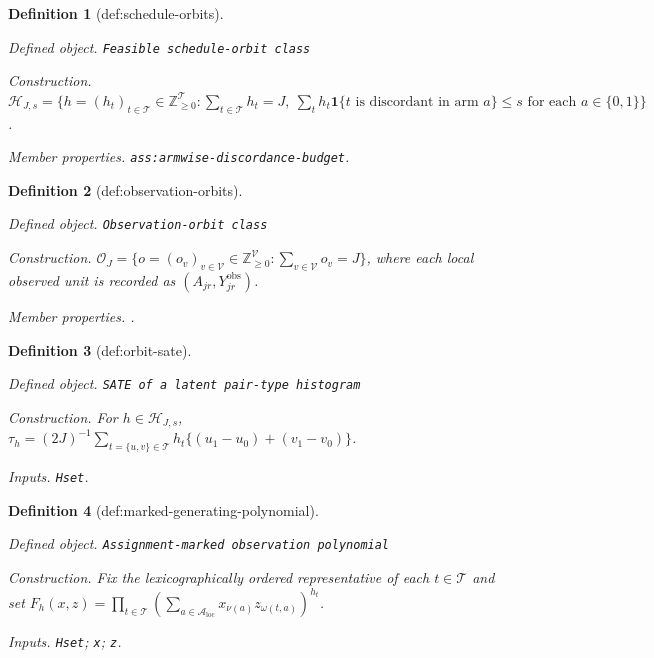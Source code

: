\documentclass{article}
\newtheorem{definition}{Definition}
\begin{document}
\begin{definition}[def:schedule-orbits]\label{def:schedule-orbits}
\par\smallskip\noindent\emph{Defined object.} \texttt{Feasible schedule-\allowbreak{}orbit class}
\par\smallskip\noindent\emph{Construction.} \(\mathcal H_{J,s}=\{h=(h_t)_{t\in\mathcal T}\in\mathbb Z_{\ge0}^{\mathcal T}:\sum_{t\in\mathcal T}h_t=J,\ \sum_t h_t\mathbf 1\{t\text{ is discordant in arm }a\}\le s\text{ for each }a\in\{0,1\}\}\).
\par\smallskip\noindent\emph{Member properties.} \texttt{ass:\allowbreak{}armwise-\allowbreak{}discordance-\allowbreak{}budget}.
\end{definition}

\begin{definition}[def:observation-orbits]\label{def:observation-orbits}
\par\smallskip\noindent\emph{Defined object.} \texttt{Observation-\allowbreak{}orbit class}
\par\smallskip\noindent\emph{Construction.} \(\mathcal O_J=\{o=(o_v)_{v\in\mathcal V}\in\mathbb Z_{\ge0}^{\mathcal V}:\sum_{v\in\mathcal V}o_v=J\}\), where each local observed unit is recorded as \((A_{jr},Y^{\mathrm{obs}}_{jr})\).
\par\smallskip\noindent\emph{Member properties.} .
\end{definition}

\begin{definition}[def:orbit-sate]\label{def:orbit-sate}
\par\smallskip\noindent\emph{Defined object.} \texttt{SATE of a latent pair-\allowbreak{}type histogram}
\par\smallskip\noindent\emph{Construction.} For \(h\in\mathcal H_{J,s}\), \(\tau_h=(2J)^{-1}\sum_{t=\{u,v\}\in\mathcal T}h_t\{(u_1-u_0)+(v_1-v_0)\}\).
\par\smallskip\noindent\emph{Inputs.} \texttt{Hset}.
\end{definition}

\begin{definition}[def:marked-generating-polynomial]\label{def:marked-generating-polynomial}
\par\smallskip\noindent\emph{Defined object.} \texttt{Assignment-\allowbreak{}marked observation polynomial}
\par\smallskip\noindent\emph{Construction.} Fix the lexicographically ordered representative of each \(t\in\mathcal T\) and set \(F_h(x,z)=\prod_{t\in\mathcal T}(\sum_{a\in\mathcal A_{\mathrm{loc}}}x_{\nu(a)}z_{\omega(t,a)})^{h_t}\).
\par\smallskip\noindent\emph{Inputs.} \texttt{Hset}; \texttt{x}; \texttt{z}.
\end{definition}
\end{document}

